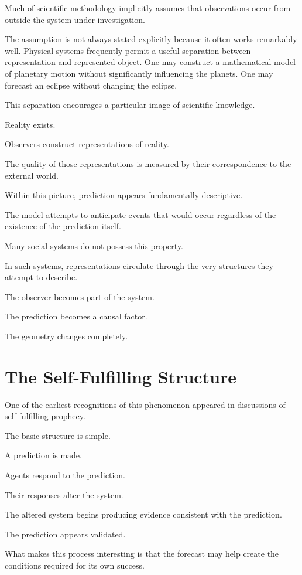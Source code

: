 \documentclass[11pt,oneside,openany]{book}
\begin{document}
Much of scientific methodology implicitly assumes that observations occur from outside the system under investigation.

The assumption is not always stated explicitly because it often works remarkably well. Physical systems frequently permit a useful separation between representation and represented object. One may construct a mathematical model of planetary motion without significantly influencing the planets. One may forecast an eclipse without changing the eclipse.

This separation encourages a particular image of scientific knowledge.

Reality exists.

Observers construct representations of reality.

The quality of those representations is measured by their correspondence to the external world.

Within this picture, prediction appears fundamentally descriptive.

The model attempts to anticipate events that would occur regardless of the existence of the prediction itself.

Many social systems do not possess this property.

In such systems, representations circulate through the very structures they attempt to describe.

The observer becomes part of the system.

The prediction becomes a causal factor.

The geometry changes completely.

\section{The Self-Fulfilling Structure}

One of the earliest recognitions of this phenomenon appeared in discussions of self-fulfilling prophecy.

The basic structure is simple.

A prediction is made.

Agents respond to the prediction.

Their responses alter the system.

The altered system begins producing evidence consistent with the prediction.

The prediction appears validated.

What makes this process interesting is that the forecast may help create the conditions required for its own success.
\end{document}
